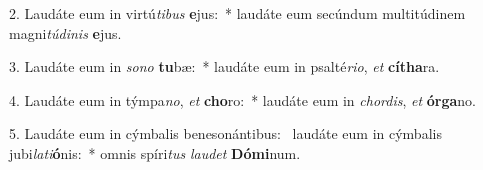 2. Laudáte eum in virtú\textit{ti}\textit{bus} \textbf{e}jus:~*  laudáte eum secúndum multitúdinem magni\textit{tú}\textit{di}\textit{nis} \textbf{e}jus.\

3. Laudáte eum in \textit{so}\textit{no} \textbf{tu}bæ:~*  laudáte eum in psalté\textit{ri}\textit{o}, \textit{et} \textbf{cí}\textbf{tha}ra.\

4. Laudáte eum in týmpa\textit{no}, \textit{et} \textbf{cho}ro:~*  laudáte eum in \textit{chor}\textit{dis}, \textit{et} \textbf{ór}\textbf{ga}no.\

5. Laudáte eum in cýmbalis benesonántibus: \dag\  laudáte eum in cýmbalis jubi\textit{la}\textit{ti}\textbf{ó}nis:~*  omnis spíri\textit{tus} \textit{lau}\textit{det} \textbf{Dó}\textbf{mi}num.\

